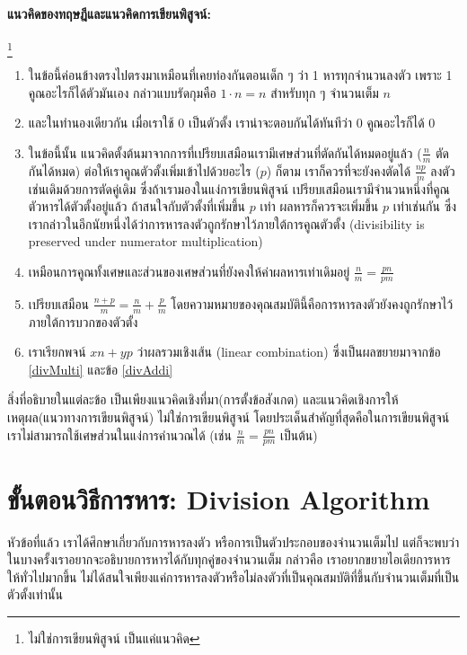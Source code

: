 \paragraph{แนวคิดของทฤษฎีและแนวคิดการเขียนพิสูจน์:}\footnote{ไม่ใช่การเขียนพิสูจน์ เป็นแค่แนวคิด}
\begin{enumerate}
	\item ในข้อนี้ค่อนข้างตรงไปตรงมาเหมือนที่เคยท่องกันตอนเด็ก ๆ ว่า 1 หารทุกจำนวนลงตัว เพราะ 1 คูณอะไรก็ได้ตัวมันเอง กล่าวแบบรัดกุมคือ $1\cdot n = n$ สำหรับทุก ๆ จำนวนเต็ม $n$
	\item และในทำนองเดียวกัน เมื่อเราใช้ 0 เป็นตัวตั้ง เราน่าจะตอบกันได้ทันทีว่า 0 คูณอะไรก็ได้ 0
	\item\label{divMulti} ในข้อนี้นั้น แนวคิดตั้งต้นมาจากการที่เปรียบเสมือนเรามีเศษส่วนที่ตัดกันได้หมดอยู่แล้ว ($\frac{n}{m}$ ตัดกันได้หมด) ต่อให้เราคูณตัวตั้งเพิ่มเข้าไปด้วยอะไร ($p$) ก็ตาม เราก็ควรที่จะยังคงตัดได้ $\frac{np}{m}$ ลงตัวเช่นเดิมด้วยการตัดคู่เดิม ซึ่งถ้าเรามองในแง่การเขียนพิสูจน์ เปรียบเสมือนเรามีจำนวนหนึ่งที่คูณตัวหารได้ตัวตั้งอยู่แล้ว ถ้าสนใจกับตัวตั้งที่เพิ่มขึ้น $p$ เท่า ผลหารก็ควรจะเพิ่มขึ้น $p$ เท่าเช่นกัน ซึ่งเรากล่าวในอีกนัยหนึ่งได้ว่าการหารลงตัวถูกรักษาไว้ภายใต้การคูณตัวตั้ง (divisibility is preserved under numerator multiplication) 
	\item เหมือนการคูณทั้งเศษและส่วนของเศษส่วนที่ยังคงให้ค่าผลหารเท่าเดิมอยู่ $\frac{n}{m} = \frac{pn}{pm}$
	\item\label{divAddi} เปรียบเสมือน $\frac{n+p}{m} = \frac{n}{m} + \frac{p}{m}$ โดยความหมายของคุณสมบัตินี้คือการหารลงตัวยังคงถูกรักษาไว้ภายใต้การบวกของตัวตั้ง
	\item เราเรียกพจน์ $xn + yp$ ว่าผลรวมเชิงเส้น (linear combination) ซึ่งเป็นผลขยายมาจากข้อ \ref{divMulti} และข้อ \ref{divAddi}
\end{enumerate}
สิ่งที่อธิบายในแต่ละข้อ เป็นเพียงแนวคิดเชิงที่มา(การตั้งข้อสังเกต) และแนวคิดเชิงการให้เหตุผล(แนวทางการเขียนพิสูจน์) ไม่ใช่การเขียนพิสูจน์ โดยประเด็นสำคัญที่สุดคือในการเขียนพิสูจน์เราไม่สามารถใช้เศษส่วนในแง่การคำนวณได้ (เช่น $\frac{n}{m} = \frac{pn}{pm}$ เป็นต้น)

\section{ขั้นตอนวิธีการหาร: Division Algorithm}
หัวข้อที่แล้ว เราได้ศึกษาเกี่ยวกับการหารลงตัว หรือการเป็นตัวประกอบของจำนวนเต็มไป แต่ก็จะพบว่าในบางครั้งเราอยากจะอธิบายการหารได้กับทุกคู่ของจำนวนเต็ม กล่าวคือ เราอยากขยายไอเดียการหารให้ทั่วไปมากขึ้น ไม่ได้สนใจเพียงแค่การหารลงตัวหรือไม่ลงตัวที่เป็นคุณสมบัติที่ขึ้นกับจำนวนเต็มที่เป็นตัวตั้งเท่านั้น

